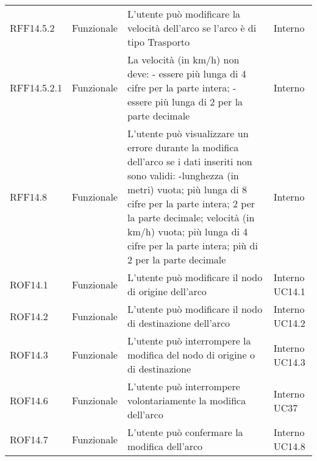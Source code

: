 \begin{longtable}{p{2cm}!{\VRule[1pt]}p{2cm}!{\VRule[1pt]}p{5cm}!{\VRule[1pt]}p{1.5cm}}
	RFF14.5.2                        & Funzionale\newline               & L'utente può modificare la velocità  dell'arco se l'arco è di tipo Trasporto                                           & Interno                      \\
	RFF14.5.2.1&Funzionale\newline  & La velocità (in km/h) non deve:
	- essere più lunga di 4 cifre per la parte intera;
	- essere più lunga di 2 per la parte decimale & Interno \\
	RFF14.8&Funzionale\newline  & L'utente può visualizzare un errore durante la modifica dell'arco se i dati inseriti non sono validi:
	-lunghezza (in metri) vuota; più lunga di 8 cifre per la parte intera; 2 per la parte decimale;
	velocità (in km/h) vuota; più lunga di 4 cifre per la parte intera; più di 2 per la parte decimale  & Interno \\
	ROF14.1                          & Funzionale\newline               & L'utente può modificare il nodo di origine dell'arco                                                                     & Interno \newline UC14.1      
	\\
	ROF14.2                          & Funzionale\newline               & L'utente può modificare il nodo di destinazione dell'arco                                                                & Interno \newline UC14.2      
	\\
	ROF14.3                          & Funzionale\newline               & L'utente può interrompere la modifica del nodo di origine o di destinazione                                              & Interno \newline UC14.3      
	\\
	ROF14.6                          & Funzionale\newline               & L'utente può interrompere volontariamente la modifica dell'arco                                                          & Interno \newline UC37        
	\\
	ROF14.7                          & Funzionale\newline               & L'utente può confermare la modifica dell'arco                                                                            & Interno \newline UC14.8      

\end{longtable}
